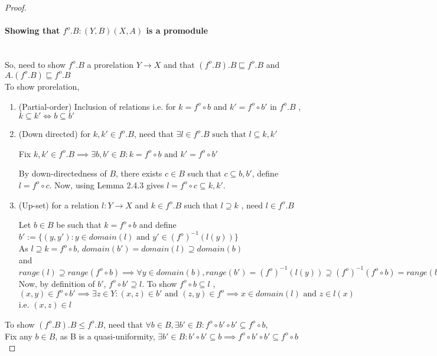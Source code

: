 \documentclass[18pt,a4paper]{article}
\makeatletter
\theoremstyle{definition}
\newcommand{\carrow}{}%
\DeclareRobustCommand{\carrow}{%
	\mathrel{\vphantom{\rightarrow}\mathpalette\circle@arrow\relax}%
}
\newcommand{\circle@arrow}[2]{%
	\m@th
	\ooalign{%
		\hidewidth$#1\circ\mkern1mu$\hidewidth\cr
	$#1\longrightarrow$\cr}%
}
\makeatother
\begin{document}
\begin{proof}
\item \paragraph{Showing that $f^o .B: (Y,B) \carrow (X,A)$ is a promodule } \mbox{} \\
	So, need to show $f^o .B$ a prorelation $Y \to X$
	and that $(f^o .B).B \sqsubseteq f^o .B$ and $A.(f^o .B) \sqsubseteq f^o .B$ \\
	To show prorelation, \begin{enumerate}[label=(\roman*)]
		\item (Partial-order) Inclusion of relations i.e. for $k=f^o \circ b$ and
			$k'=f^o \circ b'$ in $f^o .B$ , $k \subseteq k' \iff b \subseteq b'$
		\item (Down directed) for $k,k' \in f^o .B$, need that $\exists l \in f^o .B
			\text{ such that } l \subseteq k,k'$

			Fix $k,k' \in f^o .B \implies \exists b,b' \in B : k=f^o \circ b \text{ and }
			k' = f^o \circ b'$

			By down-directedness of $B$, there exists $c \in B$ such that
			$ c \subseteq b,b'$, define $l=f^o \circ c$.
			Now, using Lemma 2.4.3 gives  $l= f^o \circ c \subseteq k,k'$.
		\item (Up-set) for a relation $l:Y \to X$ and $k \in f^o .B$ such that $l \supseteq k$
			, need $l \in f^o .B$

			Let $b\in B$ be such that $k=f^o \circ b$ and define
			$b':=\{(y,y'): y \in domain(l) \text{ and } y' \in (f^o)^{-1}(l(y))\}$\\
				As $l\supseteq k=f^o \circ b$, $domain(b')=domain(l)\supseteq domain(b)$
				\\ and $range(l) \supseteq range(f^o \circ b)\implies
				\forall y \in domain(b), range (b')=(f^o )^{-1}(l(y)) \supseteq (f^o)^{-1}(f^o \circ b ) = range(b)$\\
				Now, by definition of $b'$, $f^o \circ b' \supseteq l$. To show
				$f^o \circ b \subseteq l$ , \\
				$(x,y)\in f^o \circ b' \implies \exists z \in Y: (x,z)\in b' \text{ and }
				(z,y) \in f^o \implies x \in domain(l) \text{ and } z \in l(x)$ i.e.
				$(x,z) \in l$

		\end{enumerate}
	\item	To show $(f^o .B).B \leq f^o .B$, need that $\forall b \in B,
		\exists b' \in B : f^o \circ b' \circ b' \subseteq f^o \circ b$,\\
		Fix any $b \in B$, as B is a quasi-uniformity, $\exists b' \in B : b' \circ b' \subseteq b
		\implies f^o \circ b'\circ b' \subseteq f^o \circ b$


\end{proof}
\end{document}
